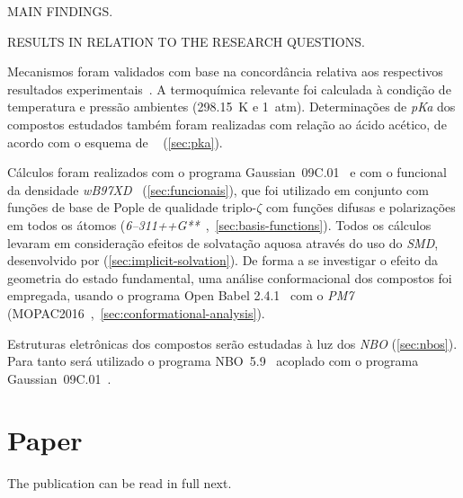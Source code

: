 MAIN FINDINGS.\@

RESULTS IN RELATION TO THE RESEARCH QUESTIONS.\@

Mecanismos foram validados com base na concordância relativa aos respectivos resultados experimentais~\cite{Kirby_1972,Jung_2005}.
A termoquímica relevante foi calculada à condição de temperatura e pressão ambientes (298.15~K e 1~atm).
Determinações de \emph{pKa} dos compostos estudados também foram realizadas com
relação ao ácido acético, de acordo com o esquema de
\citeauthor{Ding_2009}~\cite{Ding_2009} (\cref{sec:pka}).

Cálculos foram realizados com o programa Gaussian~09C.01~\cite{g09} e com o funcional da densidade
\emph{wB97XD}~\cite{Chai_2008a,Chai_2008b} (\cref{sec:funcionais}), que foi
utilizado em conjunto com funções de base de Pople de qualidade triplo-$\zeta$
com funções difusas e polarizações em todos os átomos
(\emph{6--311++G**}~\cite{Ditchfield_1971,Hehre_1972,Hariharan_1973,Hariharan_1974,Gordon_1980,Francl_1982,Clark_1983,Frisch_1984,Binning_1990,Blaudeau_1997,Rassolov_1998,Rassolov_2001},~\cref{sec:basis-functions}).
Todos os cálculos levaram em consideração efeitos de solvatação aquosa através
do uso do \emph{SMD}, desenvolvido por \citeauthor{Marenich_2009} (\cref{sec:implicit-solvation}).
De forma a se investigar o efeito da geometria do estado fundamental, uma
análise conformacional dos compostos foi empregada, usando o programa Open
Babel 2.4.1~\cite{O_Boyle_2011} com o \emph{PM7} (MOPAC2016~\cite{MOPAC},~\cref{sec:conformational-analysis}).

Estruturas eletrônicas dos compostos serão estudadas à luz dos \emph{NBO}
(\cref{sec:nbos}).
Para tanto será utilizado o programa NBO~5.9~\cite{NBO5.9} acoplado com o programa Gaussian~09C.01~\cite{g09}.

\section{Paper}

The publication can be read in full next.


